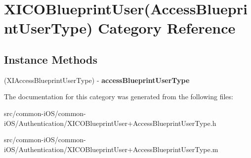 \hypertarget{category_x_i_c_o_blueprint_user_07_access_blueprint_user_type_08}{}\section{X\+I\+C\+O\+Blueprint\+User(Access\+Blueprint\+User\+Type) Category Reference}
\label{category_x_i_c_o_blueprint_user_07_access_blueprint_user_type_08}
\subsection*{Instance Methods}
\begin{DoxyCompactItemize}
\item 
\hypertarget{category_x_i_c_o_blueprint_user_07_access_blueprint_user_type_08_a9fcea87daaa48abef885caffce5268b4}{}\label{category_x_i_c_o_blueprint_user_07_access_blueprint_user_type_08_a9fcea87daaa48abef885caffce5268b4} 
(X\+I\+Access\+Blueprint\+User\+Type) -\/ {\bfseries access\+Blueprint\+User\+Type}
\end{DoxyCompactItemize}


The documentation for this category was generated from the following files\+:\begin{DoxyCompactItemize}
\item 
src/common-\/i\+O\+S/common-\/i\+O\+S/\+Authentication/X\+I\+C\+O\+Blueprint\+User+\+Access\+Blueprint\+User\+Type.\+h\item 
src/common-\/i\+O\+S/common-\/i\+O\+S/\+Authentication/X\+I\+C\+O\+Blueprint\+User+\+Access\+Blueprint\+User\+Type.\+m\end{DoxyCompactItemize}
